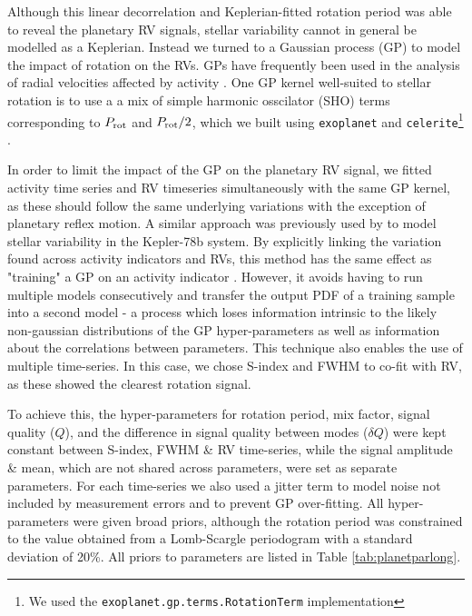\documentclass[fleqn,usenatbib]{mnras}
\begin{document}
Although this linear decorrelation and Keplerian-fitted rotation period was able to reveal the planetary RV signals, stellar variability cannot in general be modelled as a Keplerian.
Instead we turned to a Gaussian process (GP) to model the impact of rotation on the RVs.
GPs have frequently been used in the analysis of radial velocities affected by activity \citep[e.g.][]{2014MNRAS.443.2517H,2019A&A...627A..43D}.
One GP kernel well-suited to stellar rotation is to use a a mix of simple harmonic osscilator (SHO) terms corresponding to $P_{\rm rot}$ and $P_{\rm rot}/2$, which we built using \texttt{exoplanet} and \texttt{celerite}\footnote{We used the \texttt{exoplanet.gp.terms.RotationTerm} implementation} \citep{exoplanet:foremanmackey17}.

In order to limit the impact of the GP on the planetary RV signal, we fitted activity time series and RV timeseries simultaneously with the same GP kernel, as these should follow the same underlying variations with the exception of planetary reflex motion.
A similar approach was previously used by \citet{grunblatt2015determining} to model stellar variability in the Kepler-78b system.
By explicitly linking the variation found across activity indicators and RVs, this method has the same effect as "training" a GP on an activity indicator \citep[e.g.][]{2019A&A...627A..43D}.
However, it avoids having to run multiple models consecutively and transfer the output PDF of a training sample into a second model - a process which loses information intrinsic to the likely non-gaussian distributions of the GP hyper-parameters as well as information about the correlations between parameters.
This technique also enables the use of multiple time-series.
In this case, we chose S-index and FWHM to co-fit with RV, as these showed the clearest rotation signal.

To achieve this, the hyper-parameters for rotation period, mix factor, signal quality ($Q$), and the difference in signal quality between modes ($\delta Q$) were kept constant between S-index, FWHM \& RV time-series, while the signal amplitude \& mean, which are not shared across parameters, were set as separate parameters.
For each time-series we also used a jitter term to model noise not included by measurement errors and to prevent GP over-fitting.
All hyper-parameters were given broad priors, although the rotation period was constrained to the value obtained from a Lomb-Scargle periodogram with a standard deviation of 20\%.
All priors to parameters are listed in Table \ref{tab:planetparlong}.
\end{document}
